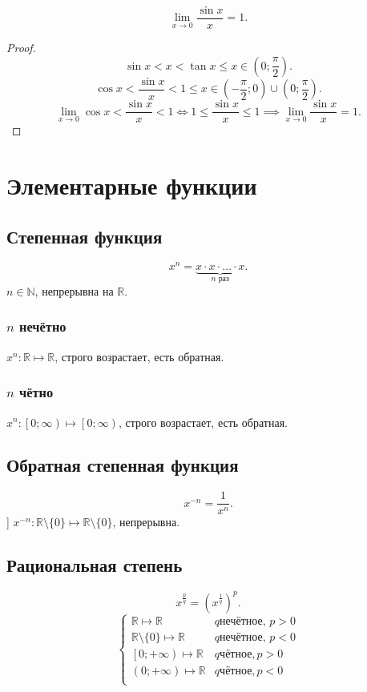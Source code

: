 \documentclass[11pt, oneside]{article}   	%
\begin{document}
\begin{theorem}
    \[ \lim\limits_{x \to 0} \frac{\sin x}{x} = 1 .\]
    \begin{proof}
        \[ \sin x < x < \tan x \le x\in \left( 0; \frac{\pi}{2} \right) .\]
        \[ \cos x < \frac{\sin x}{x} < 1 \le x\in \left(-\frac{\pi}{2};  0\right) \cup \left( 0; \frac{\pi}{2} \right)   .\]
        \[ \lim\limits_{x \to 0} \cos x < \frac{\sin x}{x} < 1  \iff 1 \le \frac{\sin x}{x} \le 1 \implies \lim\limits_{x \to 0} \frac{\sin x}{x} = 1.\] 
    \end{proof}
\end{theorem}
\section{Элементарные функции}
    \subsection{Степенная функция}
    \[ x^{n} = \underbrace{x \cdot x \cdot \ldots \cdot x}_{\text{$n$ раз}} .\]
    $n\in \mathbb{N}$, непрерывна на $\mathbb{R}$.\\
    \subsubsection{$n$ нечётно}
        $x ^{n}: \mathbb{R} \mapsto \mathbb{R}$, строго возрастает, есть обратная.
    \subsubsection{$n$ чётно}
    $x^{n}: \left[0;\infty \right) \mapsto \left[0;\infty \right)$, строго возрастает, есть обратная.
    \subsection{Обратная степенная функция}
    \[ x^{-n} = \frac{1}{x^{n}} .\]]
    $x^{-n}: \mathbb{R}\setminus \{0\} \mapsto \mathbb{R}\setminus \{0\}  $, непрерывна.
    \subsection{Рациональная степень}
    \[ x^{\frac{p}{q}} = \left(x^{\frac{1}{q}}\right)^{p} .\]
    \begin{equation*}
        \begin{cases}
            \mathbb{R} \mapsto \mathbb{R} & q \text{нечётное, } p>0\\
            \mathbb{R}\setminus \{0\} \mapsto \mathbb{R} & q \text{нечётное, } p<0\\
            \left[0; +\infty\right) \mapsto \mathbb{R} & q \text{чётное}, p>0\\
            \left(0; +\infty\right) \mapsto \mathbb{R} & q \text{чётное}, p<0\\
        \end{cases}
    \end{equation*}
\end{document}
